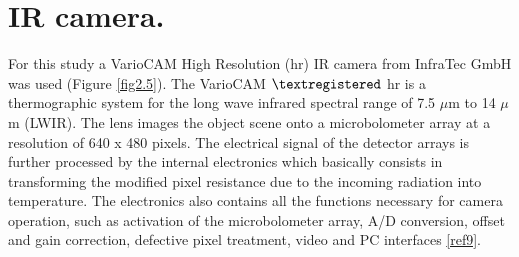 	\section{IR camera.}\label{section2.3}
	
		For this study a VarioCAM High Resolution (hr) IR camera from InfraTec GmbH was used (Figure \ref{fig2.5}). The VarioCAM $\textregistered$ hr is a thermographic system for the long wave infrared spectral range of 7.5 $\mu$m to 14 $\mu$m (LWIR). The lens images the object scene onto a microbolometer array at a resolution of 640 x 480 pixels. The electrical signal of the detector arrays is further processed by the internal electronics which basically consists in transforming the modified pixel resistance due to the incoming radiation into temperature. The electronics also contains all the functions necessary for camera operation, such as activation of the microbolometer array, A/D conversion, offset and gain correction, defective pixel treatment, video and PC interfaces \ref{ref9}.
		

